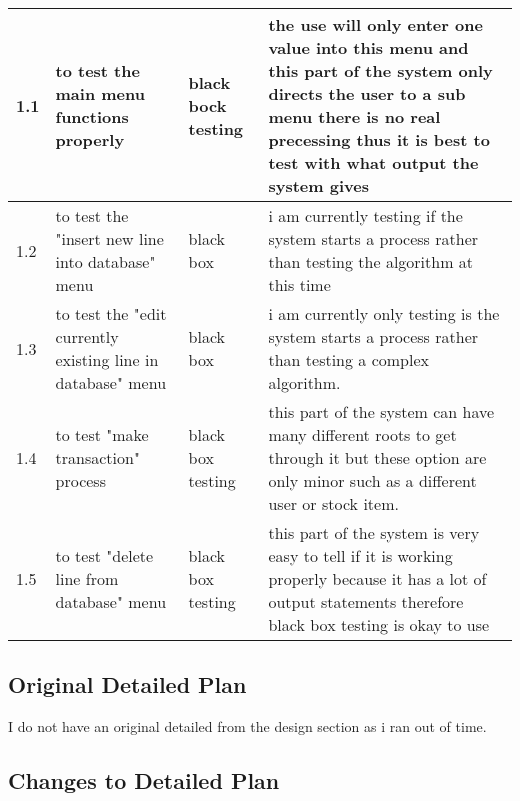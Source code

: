 \begin{landscape}
\begin{center}
\begin{tabular}{|p{2cm}|p{5cm}|p{5cm}|p{4cm}|}
        1.1 & to test the main menu functions properly  & black bock testing & the use will only enter one value into this menu and this part of the system only directs the user to a sub menu there is no real precessing thus it is best to test with what output the system gives \\ \hline
1.2 &to test the "insert new line into database" menu & black box & i am currently testing if the system starts a process rather than testing the algorithm at this time\\ \hline
1.3 & to test the "edit currently existing line in database" menu & black box &  i am currently only testing is the system starts a process rather than testing a complex algorithm. \\ \hline
1.4 & to test "make transaction" process & black box testing & this part of the system can have many different roots to get through it but these option are only minor such as a different user or stock item. \\ \hline
1.5 & to test "delete line from database" menu & black box testing & this part of the system is very easy to tell if it is working properly because it has a lot of output statements therefore black box testing is okay to use \\ \hline
    \end{tabular}
\end{center}

\subsection{Original Detailed Plan}

I do not have an original detailed from the design section as i ran out of time.

\subsection{Changes to Detailed Plan}


\end{landscape}

